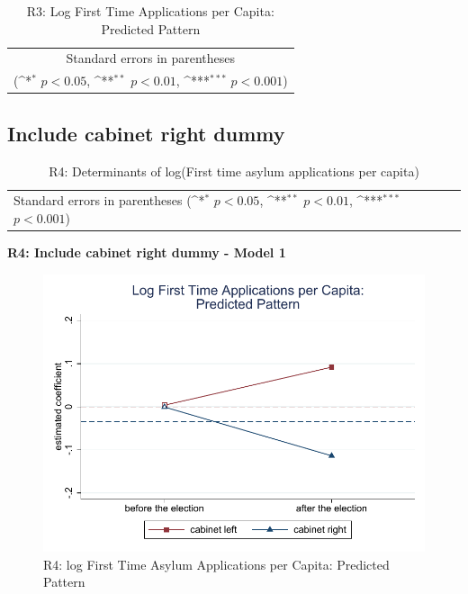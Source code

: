 \documentclass[10pt,a4paper]{scrartcl}
\begin{document}
\begin{table}[!ht]\centering
	\footnotesize
	\renewcommand{\arraystretch}{1.2}
	\def\sym#1{\ifmmode^{#1}\else\(^{#1}\)\fi}
	\caption{R3: Log First Time Applications per Capita: Predicted Pattern}
	\begin{tabular}{l*{2}{c}}
		\hline\hline
		
		\hline\hline
		\multicolumn{3}{c}{\footnotesize Standard errors in parentheses} \\
		\multicolumn{3}{c}{\footnotesize (\sym{*} \(p<0.05\), \sym{**} \(p<0.01\), \sym{***} \(p<0.001\))} \\
	\end{tabular}
\end{table}




\clearpage
\FloatBarrier
\subsection{Include cabinet right dummy}
\begin{table}[!ht]\centering
	\renewcommand{\arraystretch}{1.25}
	\small
	\def\sym#1{\ifmmode^{#1}\else\(^{#1}\)\fi}
	\caption{R4: Determinants of log(First time asylum applications per capita)}
	\begin{tabular}{l*{3}{c}}
		\hline\hline
		
		\hline\hline
		\multicolumn{4}{l}{\footnotesize Standard errors in parentheses (\sym{*} \(p<0.05\), \sym{**} \(p<0.01\), \sym{***} \(p<0.001\))}\\
	\end{tabular}
\end{table}

\clearpage
\textbf{R4: Include cabinet right dummy - Model 1}
\begin{figure}[!ht]
	\centering
	\includegraphics[width=1\textwidth]{figures_edited/app_graph1_R4.pdf}
	\caption{R4: log First Time Asylum Applications per Capita: Predicted Pattern}
\end{figure}
\end{document}
